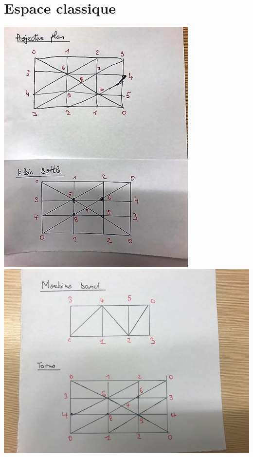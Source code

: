 \documentclass[a4paper,11pt]{article}
\begin{document}
\section{Espace classique}
\includegraphics[width=10cm]{"Fig2"}\\


\includegraphics[width=15cm]{"Fig3"}\\




	
\end{document}
